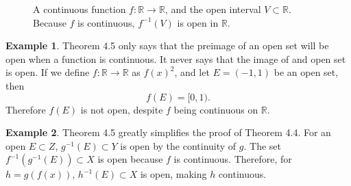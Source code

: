 \documentclass{article}
\newcommand{\R}{\mathbb{R}}
\theoremstyle{definition}
\newtheorem{example}{Example}[section]
\begin{document}
	\begin{figure}[h!]
		\centering
		\caption{A continuous function $ f:\R\to\R $, and the open interval $ V\subset \R $. Because $ f $ is continuous, $ f^{-1}(V) $ is open in $ \R $. }
	\end{figure}
	\begin{example}
		Theorem 4.5 only says that the preimage of an open set will be open when a function is continuous. It never says that the image of and open set is open. If we define $ f:\R\to\R $ as $ f(x)^2 $, and let $ E=(-1,1) $ be an open set, then $$f(E)=[0,1) .$$ Therefore $ f(E) $ is not open, despite $ f $ being continuous on $ \R $. 
	\end{example}
	\begin{example}
		Theorem 4.5 greatly simplifies the proof of Theorem 4.4. For an open $ E\subset Z $, $ g^{-1}(E)\subset Y $ is open by the continuity of $ g $. The set $ f^{-1}(g^{-1}(E))\subset X $ is open because $ f $ is continuous. Therefore, for $ h=g(f(x)) $, $ h^{-1}(E)\subset X $ is open, making $ h $ continuous. 
	\end{example}
\end{document}
